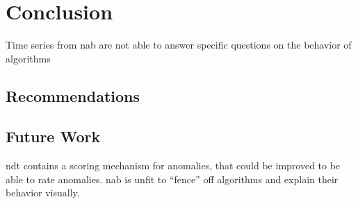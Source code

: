 \section{Conclusion}\label{sect:conclusion}
Time series from \gls{nab} are not able to answer specific questions on the
behavior of algorithms
\blindtext[1]

\subsection{Recommendations}\label{subsect:recommendations}
\blindtext[1]

\subsection{Future Work}
\gls{ndt} contains a scoring mechanism for anomalies, that could be improved
to be able to rate anomalies. \gls{nab} is unfit to ``fence'' off algorithms
and explain their behavior visually.
